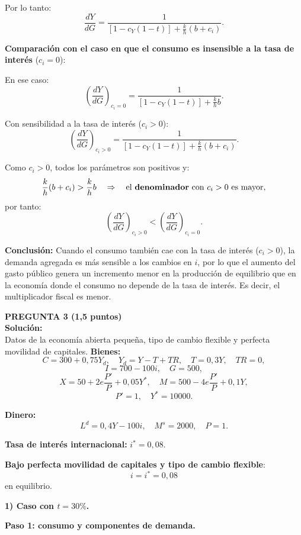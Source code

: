 \documentclass[11pt,addpoints]{article}
\begin{document}
Por lo tanto:
\[
\frac{dY}{dG} = \frac{1}{[1 - c_Y(1 - t)] + \frac{k}{h}(b + c_i)}.
\]

\textbf{Comparación con el caso en que el consumo es insensible a la tasa de interés} ($c_i = 0$):

En ese caso:
\[
\left(\frac{dY}{dG}\right)_{c_i = 0}
= \frac{1}{[1 - c_Y(1 - t)] + \frac{k}{h}b}.
\]
\newpage
\vspace*{0.5cm}

Con sensibilidad a la tasa de interés ($c_i > 0$):
\[
\left(\frac{dY}{dG}\right)_{c_i > 0}
= \frac{1}{[1 - c_Y(1 - t)] + \frac{k}{h}(b + c_i)}.
\]

Como $c_i > 0$, todos los parámetros son positivos y:
\[
\frac{k}{h}(b + c_i) > \frac{k}{h}b
\quad\Rightarrow\quad
\text{el \textbf{denominador} con $c_i>0$ es mayor},
\]
por tanto:
\[
\left(\frac{dY}{dG}\right)_{c_i > 0}
< \left(\frac{dY}{dG}\right)_{c_i = 0}.
\]

\textbf{Conclusión:}  
Cuando el consumo también cae con la tasa de interés ($c_i>0$), la demanda agregada es más sensible a los cambios en $i$, por lo que el aumento del gasto público genera un incremento menor en la producción de equilibrio que en la economía donde el consumo no depende de la tasa de interés. Es decir, el multiplicador fiscal es menor.


\vspace{0.5cm}

\textbf{PREGUNTA 3 (1,5 puntos)}\\
\textbf{Solución:}\\
Datos de la economía abierta pequeña, tipo de cambio flexible y perfecta movilidad de capitales.
\textbf{Bienes:}
\[
C = 300 + 0{,}75Y_d, \quad Y_d = Y - T + TR, \quad T = 0{,}3Y, \quad TR = 0,
\]
\[
I = 700 - 100i, \quad G = 500,
\]
\[
X = 50 + 2e\frac{P'}{P} + 0{,}05Y^*, \quad
M = 500 - 4e\frac{P'}{P} + 0{,}1Y,
\]
\[
P' = 1, \quad Y^* = 10000.
\]

\textbf{Dinero:}
\[
L^d = 0{,}4Y - 100i, \quad M^s = 2000, \quad P = 1.
\]

\textbf{Tasa de interés internacional:} $i^* = 0{,}08$.

\medskip
\textbf{Bajo perfecta movilidad de capitales y tipo de cambio flexible}:
\[
i = i^* = 0{,}08
\]
en equilibrio.

\medskip
\textbf{1) Caso con $t = 30\%$.}

\textbf{Paso 1: consumo y componentes de demanda.}
\end{document}
